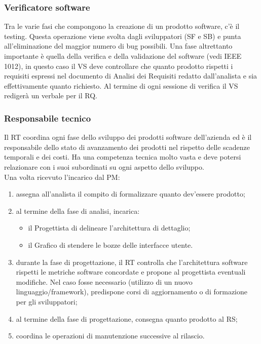 \subsubsection{Verificatore software}
Tra le varie fasi che compongono la creazione di un prodotto software, c\textquoteright{}\`{e} il testing.
Questa operazione viene svolta dagli sviluppatori (SF e SB) e punta all\textquoteright{}eliminazione del
maggior numero di bug possibili. Una fase altrettanto importante \`{e} quella della verifica
e della validazione del software (vedi IEEE 1012), in questo caso il VS deve controllare
che quanto prodotto rispetti i requisiti espressi nel documento di Analisi dei Requisiti
redatto dall\textquoteright{}analista e sia effettivamente quanto richiesto. Al termine di ogni sessione di verifica il VS rediger\`{a} un verbale per il RQ.

\subsubsection{Responsabile tecnico}
Il RT coordina ogni fase dello sviluppo dei prodotti software dell\textquoteright{}azienda ed \`{e} il responsabile
dello stato di avanzamento dei prodotti nel rispetto delle scadenze temporali e
dei costi. Ha una competenza tecnica molto vasta e deve potersi
relazionare con i suoi subordinati su ogni aspetto dello sviluppo.\\
Una volta ricevuto l\textquoteright{}incarico dal PM:
\begin{enumerate}
\item assegna all\textquoteright{}analista il compito di formalizzare quanto dev\textquoteright{}essere prodotto;
\item al termine della fase di analisi, incarica:
\begin{itemize}
\item il Progettista di delineare l\textquoteright{}architettura di dettaglio;
\item il Grafico di stendere le bozze delle interfacce utente.
\end{itemize}
\item durante la fase di progettazione, il RT controlla che l\textquoteright{}architettura software rispetti
le metriche software concordate e propone al progettista eventuali modifiche. Nel
caso fosse necessario (utilizzo di un nuovo linguaggio/framework), predispone corsi
di aggiornamento o di formazione per gli sviluppatori;
\item al termine della fase di progettazione, consegna quanto prodotto al RS;
\item coordina le operazioni di manutenzione successive al rilascio.
\end{enumerate}

